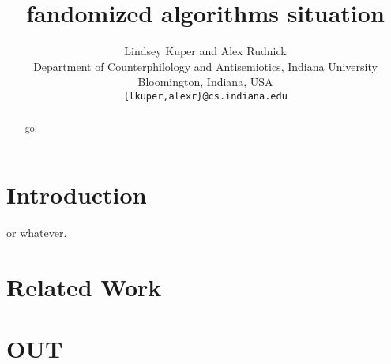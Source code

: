 \documentclass[11pt,twocolumn]{article}
\title{fandomized algorithms situation}
\author{Lindsey Kuper and Alex Rudnick \\
  Department of Counterphilology and Antisemiotics, Indiana University \\
  Bloomington, Indiana, USA\\
  {\tt \{lkuper,alexr\}@cs.indiana.edu} }
\date{}
\begin{document}
\maketitle

\begin{abstract}
go!
\end{abstract}

\section{Introduction}
\cite{DBLP:books/daglib/0067131} or whatever.

\section{Related Work}

\section{OUT}


{}
\end{document}
